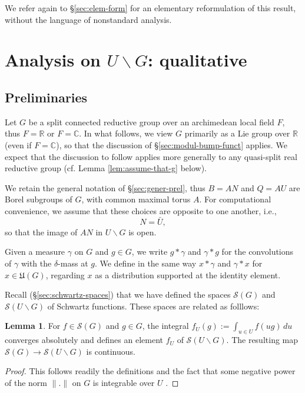 \documentclass[reqno]{amsart}
\theoremstyle{plain} \newtheorem{theorem} {Theorem}
\theoremstyle{definition} \newtheorem{definition} [theorem] {Definition}
\theoremstyle{itplain} %
\newtheorem{lemma}[theorem]{Lemma}
\numberwithin{equation}{section}
\numberwithin{theorem}{section}
\begin{document}
We refer again to \S\ref{sec:elem-form} for an elementary reformulation of this result, without the language of nonstandard analysis.





\section{Analysis on $U \backslash G$: qualitative}\label{sec:some-analysis-basic}

\subsection{Preliminaries}
Let $G$ be a split connected reductive group over an archimedean local field $F$, thus $F = \mathbb{R}$ or $F = \mathbb{C}$.  In what follows, we view $G$ primarily as a Lie group over $\mathbb{R}$ (even if $F = \mathbb{C}$), so that the discussion of \S\ref{sec:modul-bump-funct} applies.  We expect that the discussion to follow applies more generally to any quasi-split real reductive group (cf. Lemma \ref{lem:assume-that-g} below).  

We retain the general notation of \S\ref{sec:gener-prel}, thus $B = A N$ and $Q = AU$ are Borel subgroups of $G$, with common maximal torus $A$.  For computational convenience, we assume that these choices are opposite to one another, i.e.,
\begin{equation*}
N = \bar{U},
\end{equation*}
so that the image of $A N$ in $U \backslash G$ is open.

Given a measure $\gamma$ on $G$ and $g \in G$, we write $g \ast \gamma$ and $\gamma \ast g$ for the convolutions of $\gamma$ with the $\delta$-mass at $g$.  We define in the same way $x \ast \gamma$ and $\gamma \ast x$ for $x \in \mathfrak{U}(G)$, regarding $x$ as a distribution supported at the identity element.

Recall (\S\ref{sec:schwartz-spaces}) that we have defined the spaces $\mathcal{S}(G)$ and $\mathcal{S}(U \backslash G)$ of Schwartz functions.  These spaces are related as folllows:
\begin{lemma}\label{lem:cal-S-G-to-cal-S-U-G}
  For $f \in \mathcal{S}(G)$ and $g \in G$, the integral $f_U(g) := \int _{u \in U} f(u g) \, d u$ converges absolutely and defines an element $f_U$ of $\mathcal{S}(U \backslash G)$.  The resulting map $\mathcal{S}(G) \rightarrow \mathcal{S}(U \backslash G)$ is continuous.
\end{lemma}
\begin{proof}
  This follows readily the definitions and the fact that some negative power of the norm $\|.\|$ on $G$ is integrable over $U$ \cite[Cor 1.3] {MR1001613}.
\end{proof}
\end{document}
